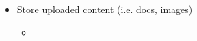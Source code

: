 \begin{itemize}
              \begin{itemize}
                \item  
                \item  
                \item  
              \end{itemize}
              
        \item Store uploaded content (i.e. docs, images)
              \begin{itemize}
                \item  
              \end{itemize}  
              
\end{itemize}
